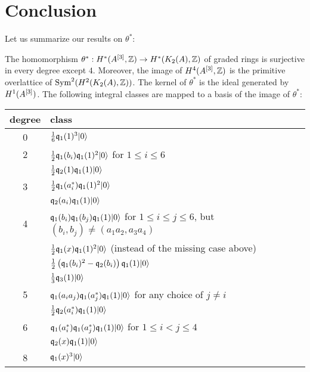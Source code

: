 \section{Conclusion}
Let us summarize our results on $\theta^*$:
\begin{theorem}\label{thetaTheorem}
The homomorphism $\theta^* : H^*(A\hilb{3},\Z)\rightarrow H^*(\kum{A}{2},\Z)$ of graded rings is surjective in every degree except $4$. Moreover, the image of $H^4(A\hilb{3},\Z)$ is the primitive overlattice of $\Sym^2(H^2(\kum{A}{2},\Z))$. 
The kernel of $\theta^*$ is the ideal generated by $H^1(A\hilb{3})$.
The following integral classes are mapped to a basis of the image of $\theta^*$:
\begin{center}
\begin{tabular}{c|l}
degree & class  \\
\hline
0 & $\frac{1}{6} \q_1(1)^3\vac$ \\
\hline
2 &  $\frac{1}{2}\q_1(b_i) \q_1(1)^2\vac$ for $1\leq i\leq 6$ \\
 & $\frac{1}{2} \q_2(1)\q_1(1)\vac $  \\
\hline
3 & $\frac{1}{2}\q_1(a^*_i)\q_1(1)^2\vac$ \\
  & $\q_2(a_i)\q_1(1)\vac$ \\
\hline
4 & $\q_1(b_i)\q_1(b_j)\q_1(1)\vac$ for $1\leq i\leq j\leq 6$, but $(b_i,b_j)\neq(a_1a_2,a_3a_4)$\\
  & $\frac{1}{2}\q_1(x)\q_1(1)^2\vac$ (instead of the missing case above) \\
  & $\frac{1}{2}\left(\q_1(b_i)^2-\q_2(b_i)\right)\q_1(1)\vac$ \\
  & $\frac{1}{3} \q_3(1)\vac$  \\
\hline
5 & $\q_1(a_ia_j)\q_1(a_j^*)\q_1(1) \vac$ for any choice of $j\neq i$ \\
  & $\frac{1}{2} \q_2(a^*_i)\q_1(1)\vac $ \\
\hline
6 & $\q_1(a_i^*)\q_1(a_j^*)\q_1(1)\vac$ for $1\leq i< j\leq 4$ \\
  & $\q_2(x)\q_1(1)\vac$ \\
\hline
8 & $\q_1(x)^3\vac$
\end{tabular}

\end{center}

\end{theorem}

